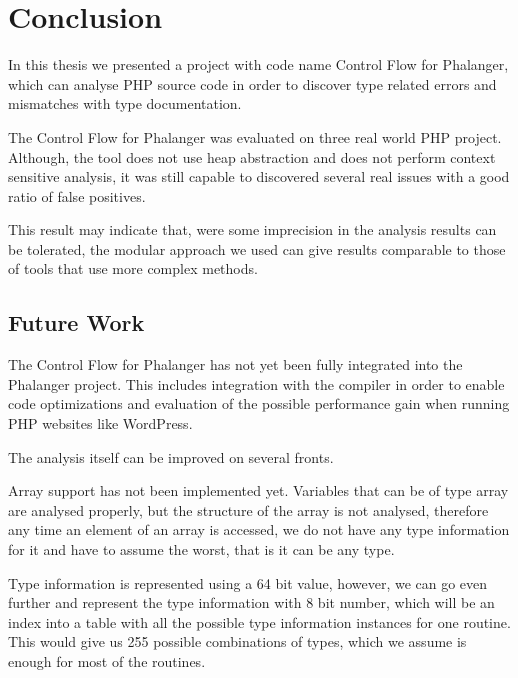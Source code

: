 \chapter{Conclusion}

    In this thesis we presented a project with code name 
    Control Flow for Phalanger, which can analyse PHP 
    source code in order to discover type related errors 
    and mismatches with type documentation.
    
    The Control Flow for Phalanger was evaluated on 
    three real world PHP project. Although, the tool 
    does not use heap abstraction and 
    does not perform context sensitive analysis, it was 
    still capable to discovered several real 
    issues with a good ratio of false positives. 
    
    This result may indicate that, were some imprecision 
    in the analysis results can be tolerated, the 
    modular approach we used can give results comparable 
    to those of tools that use more complex methods.

    \section{Future Work}
    
        The Control Flow for Phalanger has not yet been fully 
        integrated into the Phalanger project. This includes 
        integration with the compiler in order to enable 
        code optimizations and evaluation of the possible 
        performance gain when running PHP websites like WordPress.
    
        The analysis itself can be improved on several fronts.
        
        Array support has not been implemented yet. Variables 
        that can be of type array are analysed properly, but 
        the structure of the array is not analysed, therefore 
        any time an element of an array is accessed, we do not 
        have any type information for it and have to assume 
        the worst, that is it can be any type.
        
        Type information is represented using a 64 bit value, 
        however, we can go even further and represent the type 
        information with 8 bit number, which will be an index 
        into a table with all the possible type information 
        instances for one routine. This would give us 255 
        possible combinations of types, which we assume is 
        enough for most of the routines.
        